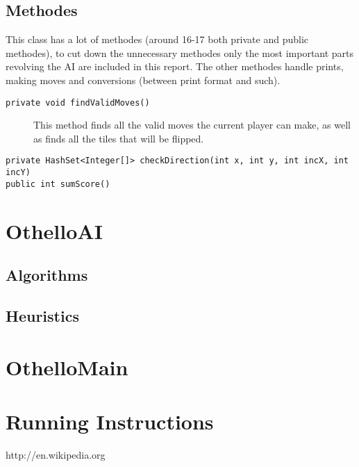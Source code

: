 \documentclass[a4paper]{article}
\begin{document}
\subsection{Methodes}
This class has a lot of methodes (around 16-17 both private and public methodes), to cut down the unnecessary methodes only the most important parts revolving the AI are included in this report. The other methodes handle prints, making moves and conversions (between print format and such). 
\begin{description}
\item[\texttt{private void findValidMoves()}] This method finds all the valid moves the current player can make, as well as finds all the tiles that will be flipped.
\item[\texttt{private HashSet<Integer[]> checkDirection(int x, int y, int incX, int incY)}]
\item[\texttt{public int sumScore()}]
\end{description} 
\section{OthelloAI}

\subsection{Algorithms}
 
\subsection{Heuristics}

\section{OthelloMain}

\section{Running Instructions}


\begin{thebibliography}{1}
http://en.wikipedia.org
\end{thebibliography}
\end{document}
